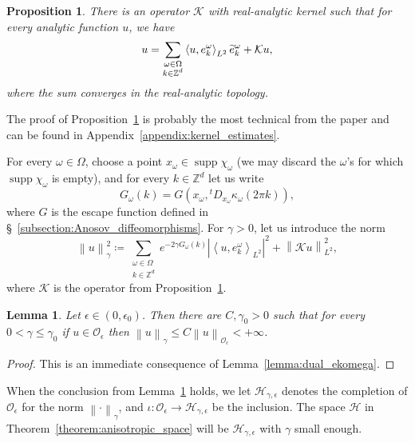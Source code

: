 \documentclass[10pt]{amsart}
\newtheorem{lemm}[theo]{Lemma}\newtheorem{prop}[theo]{Proposition}\newtheorem{coro}[theo]{Corollary}\newtheorem{conj}[theo]{Conjecture}
\theoremstyle{definition}\newtheorem{defi}[theo]{Definition}\newtheorem{rema}[theo]{Remark}\newtheorem{exam}[theo]{Example}\newtheorem{exem}[theo]{Example}\newtheorem{nota}[theo]{Notation}
\DeclareMathOperator{\supp}{supp}
\newcommand{\n}[1]{\left\|#1\right\|}
\newcommand{\va}[1]{\left|#1\right|}
\newcommand{\clO}{\mathcal{O}}
\newcommand{\clH}{\mathcal{H}}
\newcommand{\clK}{\mathcal{K}}
\newcommand{\bbZ}{\mathbb{Z}}
\let\oldtilde\tilde
\renewcommand*{\tilde}[1]{\mathchoice{\widetilde{#1}}{\widetilde{#1}}{\oldtilde{#1}}{\oldtilde{#1}}}
\begin{document}
\begin{prop}\label{proposition:reconstruction}
There is an operator $\clK $ with real-analytic kernel such that for every analytic function $u$, we have
\begin{equation}\label{eq:series}
u = \sum_{\substack{\omega \in \Omega\\
k \in \bbZ^d}} \left\langle u, e_k^\omega\right\rangle_{L^2} \tilde{e}_k^\omega + \clK u,
\end{equation}
where the sum converges in the real-analytic topology.
\end{prop}

The proof of Proposition~\ref{proposition:reconstruction} is probably the most technical from the paper and can be found in Appendix~\ref{appendix:kernel_estimates}.

For every $\omega \in \Omega$, choose a point $x_\omega \in \supp \chi_\omega$ (we may discard the $\omega$'s for which $\supp \chi_\omega$ is empty), and for every $k \in \bbZ^d$ let us write
\begin{equation*}
G_\omega(k) = G(x_\omega, {}^t D_{x_\omega} \kappa_\omega (2 \pi k)),
\end{equation*}
where $G$ is the escape function defined in \S~\ref{subsection:Anosov_diffeomorphisms}. For $\gamma > 0$, let us introduce the norm
\begin{equation*}
\n{u}_\gamma^2 \coloneqq \sum_{\substack{\omega \in \Omega \\
k \in \bbZ^d}} e^{-2 \gamma G_\omega(k)} \va{\left\langle u, e_k^\omega \right\rangle_{L^2}}^2 + \n{\clK u}_{L^2}^2,
\end{equation*}
where $\clK $ is the operator from Proposition~\ref{proposition:reconstruction}.

\begin{lemm}\label{lemma:finite_norm}
Let $\epsilon \in (0,\epsilon_0)$. Then there are $C,\gamma_0 >0$ such that for every $0 < \gamma \leq \gamma_0$ if $u \in \clO_\epsilon$ then $\n{u}_\gamma \leq C \n{u}_{\clO_\epsilon} < + \infty$.
\end{lemm}

\begin{proof}
This is an immediate consequence of Lemma~\ref{lemma:dual_ekomega}.
\end{proof}

When the conclusion from Lemma~\ref{lemma:finite_norm} holds, we let $\clH_{\gamma,\epsilon}$ denotes the completion of $\clO_\epsilon$ for the norm $\n{\cdot}_\gamma$, and $\iota : \clO_\epsilon \to \clH_{\gamma,\epsilon}$ be the inclusion. The space $\clH$ in Theorem~\ref{theorem:anisotropic_space} will be $\clH_{\gamma,\epsilon}$ with $\gamma$ small enough.
\end{document}
